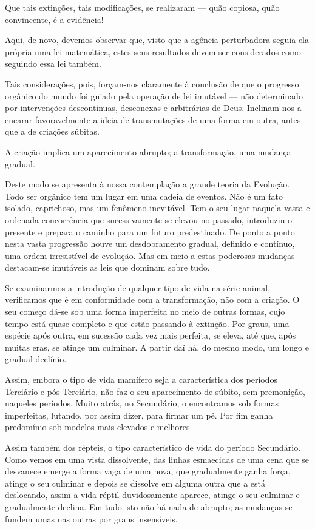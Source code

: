 \documentclass[11pt,a5paper,twoside,openany]{book}
\begin{document}
Que tais extinções, tais modificações, se realizaram — quão copiosa, quão convincente, é a evidência!

Aqui, de novo, devemos observar que, visto que a agência perturbadora seguia ela própria uma lei matemática, estes seus resultados devem ser considerados como seguindo essa lei também.

Tais considerações, pois, forçam-nos claramente à conclusão de que o progresso orgânico do mundo foi guiado pela operação de lei imutável — não determinado por intervenções descontínuas, desconexas e arbitrárias de Deus. Inclinam-nos a encarar favoravelmente a ideia de transmutações de uma forma em outra, antes que a de criações súbitas.

A criação implica um aparecimento abrupto; a transformação, uma mudança gradual.

Deste modo se apresenta à nossa contemplação a grande teoria da Evolução. Todo ser orgânico tem um lugar em uma cadeia de eventos. Não é um fato isolado, caprichoso, mas um fenômeno inevitável. Tem o seu lugar naquela vasta e ordenada concorrência que sucessivamente se elevou no passado, introduziu o presente e prepara o caminho para um futuro predestinado. De ponto a ponto nesta vasta progressão houve um desdobramento gradual, definido e contínuo, uma ordem irresistível de evolução. Mas em meio a estas poderosas mudanças destacam-se imutáveis as leis que dominam sobre tudo.

Se examinarmos a introdução de qualquer tipo de vida na série animal, verificamos que é em conformidade com a transformação, não com a criação. O seu começo dá-se sob uma forma imperfeita no meio de outras formas, cujo tempo está quase completo e que estão passando à extinção. Por graus, uma espécie após outra, em sucessão cada vez mais perfeita, se eleva, até que, após muitas eras, se atinge um culminar. A partir daí há, do mesmo modo, um longo e gradual declínio.

Assim, embora o tipo de vida mamífero seja a característica dos períodos Terciário e pós-Terciário, não faz o seu aparecimento de súbito, sem premonição, naqueles períodos. Muito atrás, no Secundário, o encontramos sob formas imperfeitas, lutando, por assim dizer, para firmar um pé. Por fim ganha predomínio sob modelos mais elevados e melhores.

Assim também dos répteis, o tipo característico de vida do período Secundário. Como vemos em uma vista dissolvente, das linhas esmaecidas de uma cena que se desvanece emerge a forma vaga de uma nova, que gradualmente ganha força, atinge o seu culminar e depois se dissolve em alguma outra que a está deslocando, assim a vida réptil duvidosamente aparece, atinge o seu culminar e gradualmente declina. Em tudo isto não há nada de abrupto; as mudanças se fundem umas nas outras por graus insensíveis.
\end{document}
